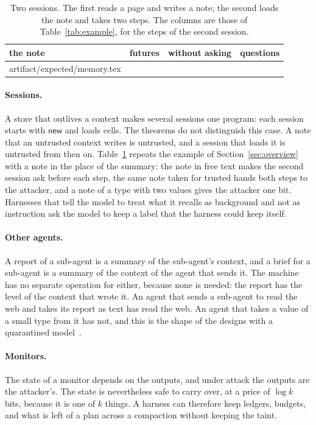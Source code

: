 \documentclass[acmsmall,nonacm,screen]{acmart}
\makeatletter
\newcommand{\kw}[1]{\mathsf{#1}}
\newcommand{\op}[1]{\kw{#1}}
\newcommand{\claim}[2]{#2}
\newcommand{\rows}[1]{\@@input artifact/expected/#1.tex }
\makeatother
\begin{document}
\begin{table}
\caption{Two sessions. The first reads a page and writes a note; the second loads the note
and takes two steps. The columns are those of Table~\ref{tab:example}, for the steps of the
second session.}
\label{tab:memory}
\begin{tabular}{lrrr}
\toprule
the note & futures & without asking & questions \\
\midrule
\rows{memory}
\bottomrule
\end{tabular}
\end{table}

\paragraph{Sessions.} A store that outlives a context makes several sessions one program:
each session starts with $\op{new}$ and loads cells. The theorems do not distinguish this
case. A note that an untrusted context writes is untrusted, and a session that loads it is
untrusted from then on. \claim{memory}{Table~\ref{tab:memory} repeats the example of
Section~\ref{sec:overview} with a note in the place of the summary}: the note in free text
makes the second session ask before each step, the same note taken for trusted hands both
steps to the attacker, and a note of a type with two values gives the attacker one bit.
Harnesses that tell the model to treat what it recalls as background and not as instruction
ask the model to keep a label that the harness could keep itself.

\paragraph{Other agents.} A report of a sub-agent is a summary of the sub-agent's context,
and a brief for a sub-agent is a summary of the context of the agent that sends it. The
machine has no separate operation for either, because none is needed: the report has the
level of the context that wrote it. An agent that sends a sub-agent to read the web and takes
its report as text has read the web. An agent that takes a value of a small type from it has
not, and this is the shape of the designs with a quarantined model~\cite{debenedetti2025,
costa2025}.

\paragraph{Monitors.} The state of a monitor depends on the outputs, and under attack the
outputs are the attacker's. The state is nevertheless safe to carry over, at a price of
$\log k$ bits, because it is one of $k$ things. A harness can therefore keep ledgers,
budgets, and what is left of a plan across a compaction without keeping the taint.
\end{document}
